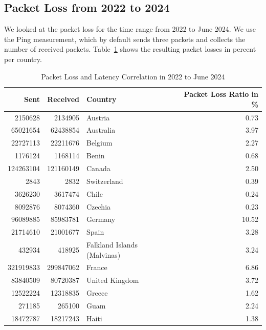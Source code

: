 \subsection{Packet Loss from 2022 to 2024} \label{sec:packet-loss}

We looked at the packet loss for the time range from 2022 to June 2024. We use
the Ping measurement, which by default sends three packets and collects the
number of received packets. Table~\ref{fig:packetloss-total} shows the
resulting packet losses in percent per country.

\begin{table}
	\footnotesize
	\caption{Packet Loss and Latency Correlation in 2022 to June 2024}
	\label{fig:packetloss-total}
	\begin{tabular}{rrlr}
		\toprule
		Sent      & Received  & Country                     & Packet
		Loss Ratio in \%                                             \\
		\midrule
		2150628   & 2134905   & Austria                     & 0.73   \\
		65021654  & 62438854  & Australia                   & 3.97   \\
		22727113  & 22211676  & Belgium                     & 2.27   \\
		1176124   & 1168114   & Benin                       & 0.68   \\
		124263104 & 121160149 & Canada                      & 2.50   \\
		2843      & 2832      & Switzerland                 & 0.39   \\
		3626230   & 3617474   & Chile                       & 0.24   \\
		8092876   & 8074360   & Czechia                     & 0.23   \\
		96089885  & 85983781  & Germany                     & 10.52  \\
		21714610  & 21001677  & Spain                       & 3.28   \\
		432934    & 418925    & Falkland Islands (Malvinas) & 3.24   \\
		321919833 & 299847062 & France                      & 6.86   \\
		83840509  & 80720387  & United Kingdom              & 3.72   \\
		12522224  & 12318835  & Greece                      & 1.62   \\
		271185    & 265100    & Guam                        & 2.24   \\
		18472787  & 18217243  & Haiti                       & 1.38   \\

\end{tabular}
\end{table}
